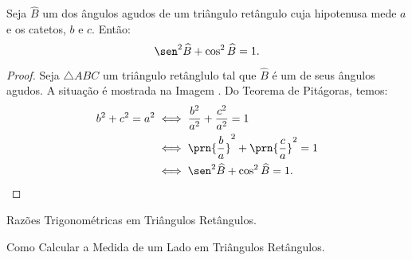 \begin{proposition}
Seja $\widehat B$ um dos ângulos agudos de um triângulo retângulo
cuja hipotenusa mede $a$ e os catetos, $b$ e $c$. Então:
$$\sen^2 \widehat B + \cos^2 \widehat B = 1.$$
\end{proposition}

\begin{proof}
    Seja $\triangle ABC$ um triângulo retânglulo tal que $\widehat B$ é um de seus ângulos agudos. A situação é 
    mostrada na Imagem . %
    Do Teorema de Pitágoras, temos:
    \begin{align*}
        b^2 + c^2 = a^2 &\iff \frac{b^2}{a^2} + \frac{c^2}{a^2} = 1 \\ &\iff \prn{\frac b a}^2 + \prn{\frac c a}^2 = 1 \\ 
        &\iff \sen^2 \widehat B  +  \cos^2 \widehat B= 1.
    \end{align*}
\end{proof}

\begin{onlineact}
    {Razões Trigonométricas em Triângulos
Retângulos}.
\end{onlineact}

\begin{onlineact}
    {Como Calcular a Medida de um Lado em Triângulos Retângulos}.
\end{onlineact}